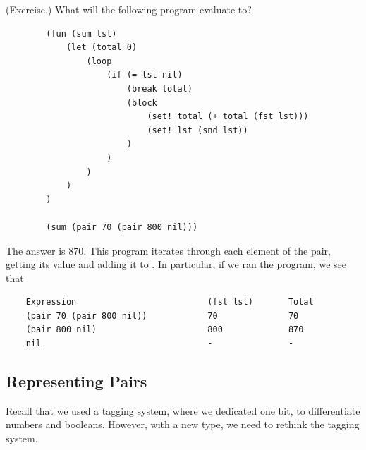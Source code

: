 \begin{mdframed}
    (Exercise.) What will the following program evaluate to? 
    \begin{verbatim}
        (fun (sum lst)
            (let (total 0)
                (loop 
                    (if (= lst nil) 
                        (break total) 
                        (block
                            (set! total (+ total (fst lst)))
                            (set! lst (snd lst)) 
                        )
                    )
                )
            )
        )
    
        (sum (pair 70 (pair 800 nil)))\end{verbatim}
    
    \begin{mdframed}
        The answer is 870. This program iterates through each element of the pair, getting its value and adding it to . In particular, if we ran the program, we see that 
        \begin{verbatim}        
    Expression                          (fst lst)       Total
    (pair 70 (pair 800 nil))            70              70
    (pair 800 nil)                      800             870 
    nil                                 -               -\end{verbatim}
    \end{mdframed}
\end{mdframed}

\subsection{Representing Pairs}
Recall that we used a tagging system, where we dedicated one bit, to differentiate numbers and booleans. However, with a new type, we need to rethink the tagging system. 

\bigskip 

